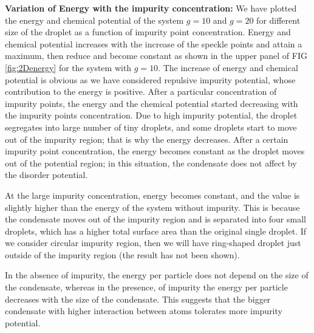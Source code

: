 \documentclass[amsmath,amssymb,lengthcheck,aps,prl] {revtex4}
\begin{document}
{\bf Variation of Energy with the impurity concentration:} 
We have plotted the energy and chemical potential of the system $g=10$ and $g=20$ for different size of the droplet as a function of impurity point concentration. Energy and chemical potential increases with the increase of the speckle points and attain a maximum, then reduce and become constant as shown in the upper panel of FIG \ref{fig:2Denergy} for the system with $g=10$. The increase of energy and chemical potential is obvious as we have considered repulsive impurity potential, whose contribution to the energy is positive. %
After a particular concentration of impurity points, the energy and the chemical potential started decreasing with the impurity points concentration. 
Due to high impurity potential, the droplet segregates into large number of tiny droplets, and some droplets start to move out of the impurity region; that is why the energy decreases.
 After a certain impurity point concentration, the energy becomes constant as the droplet moves out of the potential region; in this situation, the condensate does not affect by the disorder potential.  

At the large impurity concentration, energy becomes constant, and the value is slightly higher than the energy of the system without impurity. This is because the condensate moves out of the impurity region and is separated into four small droplets, which has a higher total surface area than the original single droplet. If we consider circular impurity region, then we will have ring-shaped droplet just outside of the impurity region (the result has not been shown).

In the absence of impurity, the energy per particle does not depend on the size of the condensate, whereas in the presence, of impurity the energy per particle decreases with the size of the condensate. This suggests that the bigger condensate with higher interaction between atoms tolerates more impurity potential.

\end{document}
